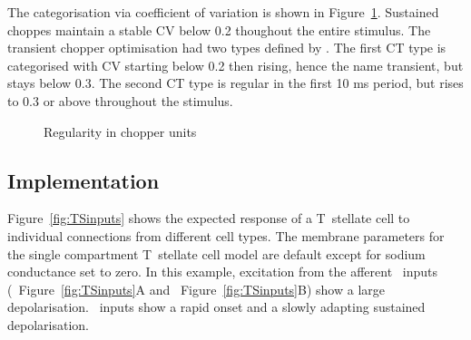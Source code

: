 The categorisation via coefficient of variation is shown in
Figure~\ref{fig:PaoliniCVdata}. Sustained choppes maintain a stable CV below 0.2
thoughout the entire stimulus. The transient chopper optimisation had two types
defined by \citep{PaoliniClareyEtAl:2005}.  The first CT type is categorised
with CV starting below 0.2 then rising, hence the name transient, but stays
below 0.3.  The second CT type is regular in the first 10 ms period, but rises to 0.3
or above throughout the stimulus.

\begin{figure}[htb]
  \centering
  \caption{Regularity in chopper units \citep[Data reproduced from Fig.~2,~][]{PaoliniClareyEtAl:2005}}
  \label{fig:PaoliniCVdata}
\end{figure}





\subsection{Implementation}






Figure~\ref{fig:TSinputs} shows the expected response of a T~stellate cell to
individual connections from different cell types. The membrane parameters for
the single compartment T~stellate cell model are default except for sodium
conductance set to zero. In this example, excitation from the afferent
\ANF~inputs (\LSR~Figure~\ref{fig:TSinputs}A and
\HSR~Figure~\ref{fig:TSinputs}B) show a large depolarisation.  \HSR~inputs show
a rapid onset and a slowly adapting sustained depolarisation.




